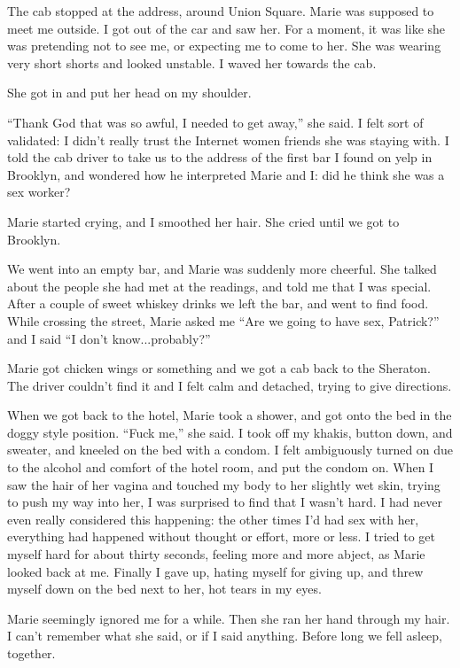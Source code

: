 \documentclass[12pt]{article}
\begin{document}
The cab stopped at the address, around Union Square.  Marie was supposed to meet
me outside.  I got out of the car and saw her.  For a moment, it was like she
was pretending not to see me, or expecting me to come to her.  She was wearing
very short shorts and looked unstable.  I waved her towards the cab.  

She got in and put her head on my shoulder.

``Thank God that was so awful, I needed to get away,'' she said.  I felt sort of
validated: I didn't really trust the Internet women friends she was staying
with.  I told the cab driver to take us to the address of the first bar I found
on yelp in Brooklyn, and wondered how he interpreted Marie and I: did he think
she was a sex worker?  

Marie started crying, and I smoothed her hair.  She cried until we got to
Brooklyn.

We went into an empty bar, and Marie was suddenly more cheerful.  She talked
about the people she had met at the readings, and told me that I was special.
After a couple of sweet whiskey drinks we left the bar, and went to find 
food.  While crossing the street, Marie asked me ``Are we going to have sex,
Patrick?'' and I said ``I don't know...probably?''

Marie got chicken wings or something and we got a cab back to the Sheraton.  The
driver couldn't find it and I felt calm and detached, trying to give directions.  

When we got back to the hotel, Marie took a shower, and got onto the bed in the
doggy style position.  ``Fuck me,'' she said.  I took off my khakis, button
down, and sweater, and kneeled on the bed with a condom.  I felt ambiguously
turned on due to the alcohol and comfort of the hotel room, and put the condom
on.  When I saw the hair of her vagina and touched my body to her slightly wet
skin, trying to push my way into her, I was surprised to find that I wasn't
hard.  I had never even really considered this happening: the other times I'd
had sex with her, everything had happened without thought or effort, more or
less.  I tried to get myself hard for about thirty seconds, feeling more and
more abject, as Marie looked back at me.  Finally I gave up, hating myself for
giving up, and threw myself down on the bed next to her, hot tears in my eyes.

Marie seemingly ignored me for a while. Then she ran her hand through my hair.
I can't remember what she said, or if I said anything.  Before long we fell
asleep, together.
\end{document}
